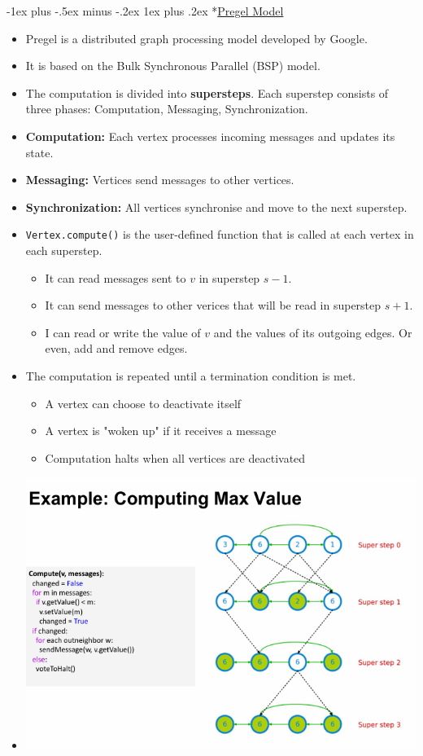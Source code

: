 \documentclass[10pt, landscape]{article}
\makeatletter
\renewcommand{\subsubsection}{\@startsection{subsubsection}{3}{0mm}%
  {-1ex plus -.5ex minus -.2ex}%
  {1ex plus .2ex}%
{\normalfont\small\bfseries}}%
\makeatother
\begin{document}
\begin{multicols*}{4}
    \subsubsection*{\underline{Pregel Model}}
    \begin{itemize}
      \item Pregel is a distributed graph processing model developed by Google.
      \item It is based on the Bulk Synchronous Parallel (BSP) model.
      \item The computation is divided into \textbf{supersteps}. Each superstep consists of three phases: Computation, Messaging, Synchronization.
      \item \textbf{Computation:} Each vertex processes incoming messages and updates its state.
      \item \textbf{Messaging:} Vertices send messages to other vertices.
      \item \textbf{Synchronization:} All vertices synchronise and move to the next superstep.
      \item \texttt{Vertex.compute()} is the user-defined function that is called at each vertex in each superstep.
            \begin{itemize}
              \item It can read messages sent to $v$ in superstep $s - 1$.
              \item It can send messages to other verices that will be read in superstep $s + 1$.
              \item I can read or write the value of $v$ and the values of its outgoing edges. Or even, add and remove edges.
            \end{itemize}
      \item The computation is repeated until a termination condition is met.
            \begin{itemize}
              \item A vertex can choose to deactivate itself
              \item A vertex is "woken up" if it receives a message
              \item Computation halts when all vertices are deactivated
            \end{itemize}
      \item \includegraphics*[width=0.95\linewidth]{pregel_count_max.png}

\end{itemize}
\end{multicols*}
\end{document}
